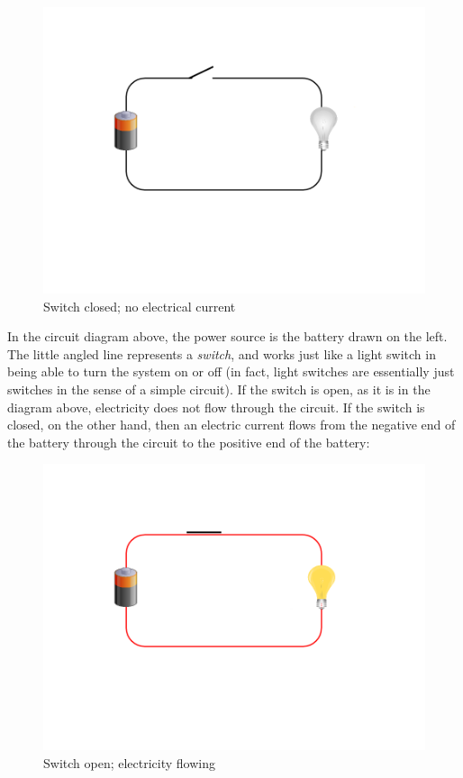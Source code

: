 \documentclass[UTF8]{book}
\begin{document}
\begin{CJK}{UTF8}{gbsn}
\begin{figure}[H]
\centering
\includegraphics[width=0.8\linewidth]{circuit1}
\caption{Switch closed; no electrical current}
\end{figure}

In the circuit diagram above, the power source is the battery drawn on the left. The little angled line represents a \emph{switch}, and works just like a light switch in being able to turn the system on or off (in fact, light switches are essentially just switches in the sense of a simple circuit). If the switch is open, as it is in the diagram above, electricity does not flow through the circuit. If the switch is closed, on the other hand, then an electric current flows from the negative end of the battery through the circuit to the positive end of the battery:

\begin{figure}[H]
\centering
\includegraphics[width=0.8\linewidth]{circuit2}
\caption{Switch open; electricity flowing}
\end{figure}


\end{CJK}
\end{document}

